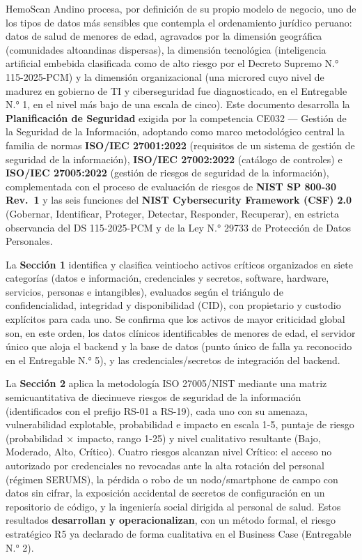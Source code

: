 \documentclass[11pt,a4paper]{article}
\begin{document}
HemoScan Andino procesa, por definición de su propio modelo de negocio, uno de los tipos de datos más sensibles que contempla el ordenamiento jurídico peruano: datos de salud de menores de edad, agravados por la dimensión geográfica (comunidades altoandinas dispersas), la dimensión tecnológica (inteligencia artificial embebida clasificada como de alto riesgo por el Decreto Supremo N.° 115-2025-PCM) y la dimensión organizacional (una microred cuyo nivel de madurez en gobierno de TI y ciberseguridad fue diagnosticado, en el Entregable N.° 1, en el nivel más bajo de una escala de cinco). Este documento desarrolla la \textbf{Planificación de Seguridad} exigida por la competencia CE032 --- Gestión de la Seguridad de la Información, adoptando como marco metodológico central la familia de normas \textbf{ISO/IEC 27001:2022} (requisitos de un sistema de gestión de seguridad de la información), \textbf{ISO/IEC 27002:2022} (catálogo de controles) e \textbf{ISO/IEC 27005:2022} (gestión de riesgos de seguridad de la información), complementada con el proceso de evaluación de riesgos de \textbf{NIST SP 800-30 Rev.~1} y las seis funciones del \textbf{NIST Cybersecurity Framework (CSF) 2.0} (Gobernar, Identificar, Proteger, Detectar, Responder, Recuperar), en estricta observancia del DS 115-2025-PCM y de la Ley N.° 29733 de Protección de Datos Personales.

La \textbf{Sección 1} identifica y clasifica veintiocho activos críticos organizados en siete categorías (datos e información, credenciales y secretos, software, hardware, servicios, personas e intangibles), evaluados según el triángulo de confidencialidad, integridad y disponibilidad (CID), con propietario y custodio explícitos para cada uno. Se confirma que los activos de mayor criticidad global son, en este orden, los datos clínicos identificables de menores de edad, el servidor único que aloja el backend y la base de datos (punto único de falla ya reconocido en el Entregable N.° 5), y las credenciales/secretos de integración del backend.

La \textbf{Sección 2} aplica la metodología ISO 27005/NIST mediante una matriz semicuantitativa de diecinueve riesgos de seguridad de la información (identificados con el prefijo RS-01 a RS-19), cada uno con su amenaza, vulnerabilidad explotable, probabilidad e impacto en escala 1-5, puntaje de riesgo (probabilidad × impacto, rango 1-25) y nivel cualitativo resultante (Bajo, Moderado, Alto, Crítico). Cuatro riesgos alcanzan nivel Crítico: el acceso no autorizado por credenciales no revocadas ante la alta rotación del personal (régimen SERUMS), la pérdida o robo de un nodo/smartphone de campo con datos sin cifrar, la exposición accidental de secretos de configuración en un repositorio de código, y la ingeniería social dirigida al personal de salud. Estos resultados \textbf{desarrollan y operacionalizan}, con un método formal, el riesgo estratégico R5 ya declarado de forma cualitativa en el Business Case (Entregable N.° 2).
\end{document}
